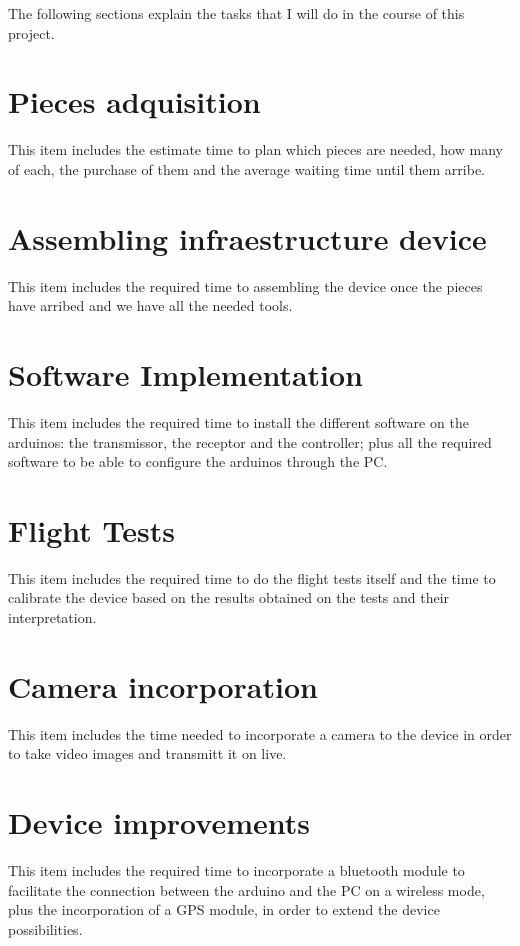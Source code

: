 \documentclass[12pt, a4paper,twoside]{tesi_upf}
\begin{document}
The following sections explain the tasks that I will do in the course of this project.

\section{Pieces adquisition}

This item includes the estimate time to plan which pieces are needed, how many of each, the purchase of them and the average waiting time until them arribe. 

\section{Assembling infraestructure device}

This item includes the required time to assembling the device once the pieces have arribed and we have all the needed tools.

\section{Software Implementation}

This item includes the required time to install the different software on the arduinos: the transmissor, the receptor and the controller; plus all the required software to be able to configure the arduinos through the PC.

\section{Flight Tests}

This item includes the required time to do the flight tests itself and the time to calibrate the device based on the results obtained on the tests and their interpretation.

\section{Camera incorporation}

This item includes the time needed to incorporate a camera to the device in order to take video images and transmitt it on live.

\section{Device improvements}

This item includes the required time to incorporate a bluetooth module to facilitate the connection between the arduino and the PC on a wireless mode, plus the incorporation of a GPS module, in order to extend the device possibilities.
\end{document}
